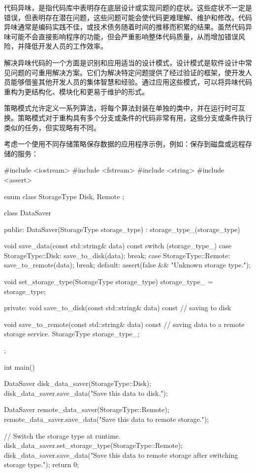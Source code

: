 代码异味，是指代码库中表明存在底层设计或实现问题的症状。这些症状不一定是错误，但表明存在潜在问题，这些问题可能会使代码更难理解、维护和修改。代码异味通常是编码实践不佳，或技术债务随着时间的推移而积累的结果。虽然代码异味可能不会直接影响程序的功能，但会严重影响整体代码质量，从而增加错误风险，并降低开发人员的工作效率。

解决异味代码的一个方面是识别和应用适当的设计模式，设计模式是软件设计中常见问题的可重用解决方案。它们为解决特定问题提供了经过验证的框架，使开发人员能够借鉴其他开发人员的集体智慧和经验。通过应用这些模式，可以将异味代码重构为更结构化、模块化和更易于维护的形式。

策略模式允许定义一系列算法，将每个算法封装在单独的类中，并在运行时可互换。策略模式对于重构具有多个分支或条件的代码非常有用，这些分支或条件执行类似的任务，但实现略有不同。

考虑一个使用不同存储策略保存数据的应用程序示例，例如：保存到磁盘或远程存储的服务：

\begin{cpp}
#include <iostream>
#include <fstream>
#include <string>
#include <assert>

enum class StorageType {
    Disk,
    Remote
};

class DataSaver {
public:
    DataSaver(StorageType storage_type) : storage_type_(storage_type)
    {}

    void save_data(const std::string& data) const {
        switch (storage_type_) {
            case StorageType::Disk:
            save_to_disk(data);
            break;
            case StorageType::Remote:
            save_to_remote(data);
            break;
            default:
            assert(false && "Unknown storage type.");
        }
    }

    void set_storage_type(StorageType storage_type) {
        storage_type_ = storage_type;
    }

private:
    void save_to_disk(const std::string& data) const {
        // saving to disk
    }

    void save_to_remote(const std::string& data) const {
        // saving data to a remote storage service.
    }
    StorageType storage_type_;
};

int main() {
    DataSaver disk_data_saver(StorageType::Disk);
    disk_data_saver.save_data("Save this data to disk.");

    DataSaver remote_data_saver(StorageType::Remote);
    remote_data_saver.save_data("Save this data to remote storage.");

    // Switch the storage type at runtime.
    disk_data_saver.set_storage_type(StorageType::Remote);
    disk_data_saver.save_data("Save this data to remote storage after switching storage type.");
    return 0;
}
\end{cpp}

